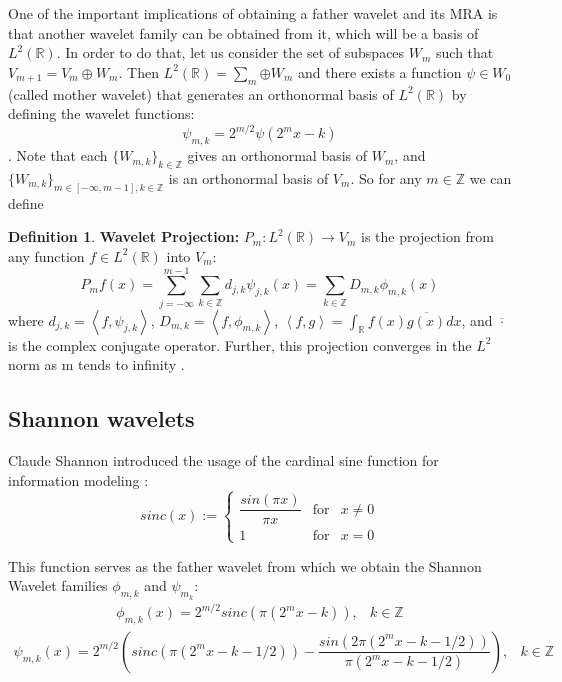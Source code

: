 \documentclass[12,twoside]{mammeTFM}
\theoremstyle{definition}
\newtheorem{definition}[thm]{Definition}
\theoremstyle{remark}
\newcommand{\Z}{\ensuremath{\mathbb{Z}}}
\newcommand{\R}{\ensuremath{\mathbb{R}}}
\begin{document}
One of the important implications of obtaining a father wavelet and its MRA is that another wavelet family can be obtained from it, which will be a basis of $L^2(\R)$. In order to do that, let us consider the set of subspaces $W_m$ such that $V_{m+1} = V_m \oplus W_m$. Then $L^2(\R) = \sum_m{\oplus W_m}$ and there exists a function $\psi \in W_0$ (called mother wavelet) that generates an orthonormal basis of $L^2(\R)$ \cite{dau92} by defining the wavelet functions:
$$ \psi_{m, k} = 2^{m/2}\psi(2^m x - k)$$
. Note that each $\{W_{m,k}\}_{k \in \Z}$ gives an orthonormal basis of $W_m$, and $\{W_{m,k}\}_{m\in [-\infty, m-1], k \in \Z}$ is an orthonormal basis of $V_m$. So for any $m \in \Z$ we can define 
\begin{definition} \label{def:wavelet_projection}
\textbf{Wavelet Projection:} $P_m: L^2(\R) \rightarrow V_m$ is the projection from any function $f \in L^2(\R)$ into $V_m$:
\begin{equation}
P_m f(x) = \sum_{j = -\infty}^{m-1} \sum_{k \in \Z} d_{j,k} \psi_{j, k}(x) = \sum_{k \in \Z} D_{m,k} \phi_{m, k}(x)
\end{equation}
where $d_{j, k} = \left\langle f,\psi_{j, k}\right\rangle$, $D_{m,k} = \left\langle f,\phi_{m, k}\right\rangle$, $\left\langle f,g\right\rangle = \int_\R f(x) \overline{g(x)} dx$, and $\overline{\cdot}$ is the complex conjugate operator. Further, this projection converges in the $L^2$ norm as m tends to infinity \cite{tour}.
\end{definition}

\subsection{Shannon wavelets}
Claude Shannon introduced the usage of the cardinal sine function for information modeling \cite{sha49}:
\begin{equation}
sinc(x) := \left\{ \begin{array}{rcl} \dfrac{sin(\pi x)}{\pi x} & \mbox{for} & x \neq 0 \\ 1 & \mbox{for} & x = 0 \end{array}\right.
\end{equation}

This function serves as the father wavelet from which we obtain the Shannon Wavelet families $\phi_{m, k}$ and $\psi_{m_k}$:
\begin{equation}
\begin{array}{rcl}
\label{eq:wavelet}
\phi_{m,k}(x) = 2^{m/2} sinc(\pi (2^m x - k)), & k \in \Z
\end{array}
\end{equation}
\begin{equation}
\begin{array}{rcl}
\psi_{m,k}(x) = 2^{m/2} \left( sinc(\pi (2^m x - k - 1/2)) - \dfrac{sin(2 \pi (2^m x - k - 1/2))}{\pi (2^m x - k - 1/2)} \right), & k \in \Z
\end{array}
\end{equation}
\end{document}
